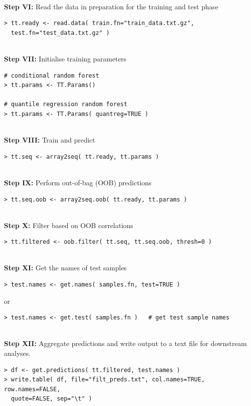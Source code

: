 \documentclass[a4paper,12pt]{article}
\begin{document}
\noindent\\
\textbf{Step VI:} Read the data in preparation for the training and test phase
\begin{verbatim}
> tt.ready <- read.data( train.fn="train_data.txt.gz", 
  test.fn="test_data.txt.gz" )
\end{verbatim}

\noindent\\
\textbf{Step VII:} Initialise training parameters
\begin{verbatim}
# conditional random forest
> tt.params <- TT.Params()

# quantile regression random forest
> tt.params <- TT.Params( quantreg=TRUE )
\end{verbatim}

\noindent\\
\textbf{Step VIII:} Train and predict
\begin{verbatim}
> tt.seq <- array2seq( tt.ready, tt.params )
\end{verbatim}

\noindent\\
\textbf{Step IX:} Perform out-of-bag (OOB) predictions
\begin{verbatim}
> tt.seq.oob <- array2seq.oob( tt.ready, tt.params )
\end{verbatim}

\noindent\\
\textbf{Step X:} Filter based on OOB correlations
\begin{verbatim}
> tt.filtered <- oob.filter( tt.seq, tt.seq.oob, thresh=0 )
\end{verbatim}

\noindent\\
\textbf{Step XI:} Get the names of test samples
\begin{verbatim}
> test.names <- get.names( samples.fn, test=TRUE )
\end{verbatim}
or 
\begin{verbatim}
> test.names <- get.test( samples.fn )   # get test sample names
\end{verbatim}

\noindent\\
\textbf{Step XII:} Aggregate predictions and write output to a text file for downstream analyses.
\begin{verbatim}
> df <- get.predictions( tt.filtered, test.names )
> write.table( df, file="filt_preds.txt", col.names=TRUE, row.names=FALSE, 
  quote=FALSE, sep="\t" )
\end{verbatim}
\end{document}
